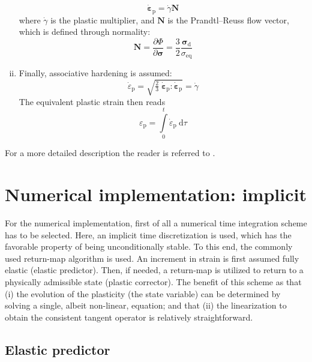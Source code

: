 \documentclass[times,namecite]{goose-article}
\begin{document}
\begin{enumerate}[(i)]
\begin{equation}
  \dot{\bm{\varepsilon}}_\mathrm{p}
  = \dot{\gamma} \bm{N}
\end{equation}
where $\dot{\gamma}$ is the plastic multiplier, and $\bm{N}$ is the Prandtl--Reuss flow vector, which is defined through normality:
\begin{equation}
  \bm{N}
  = \frac{\partial \Phi}{\partial \bm{\sigma}}
  = \frac{3}{2}
    \frac{\bm{\sigma}_\mathrm{d}}{\sigma_\mathrm{eq}}
\end{equation}
%
\item Finally, associative hardening is assumed:
\begin{equation}
  \dot{\varepsilon}_\mathrm{p}
  = \sqrt{\tfrac{2}{3} \; \dot{\bm{\varepsilon}}_\mathrm{p} : \dot{\bm{\varepsilon}}_\mathrm{p}}
  = \dot{\gamma}
\end{equation}
The equivalent plastic strain then reads
\begin{equation}
  \varepsilon_\mathrm{p} =
  \int\limits_0^t \dot{\varepsilon}_\mathrm{p} ~\mathrm{d}\tau
\end{equation}
%
\end{enumerate}
%
For a more detailed description the reader is referred to \citet[][p.\ 216-234]{DeSouzaNeto2008}.

\vfill\newpage
\section{Numerical implementation: implicit}

For the numerical implementation, first of all a numerical time integration scheme has to be selected. Here, an implicit time discretization is used, which has the favorable property of being unconditionally stable. To this end, the commonly used return-map algorithm is used. An increment in strain is first assumed fully elastic (elastic predictor). Then, if needed, a return-map is utilized to return to a physically admissible state (plastic corrector). The benefit of this scheme as that (i) the evolution of the plasticity (the state variable) can be determined by solving a single, albeit non-linear, equation; and that (ii) the linearization to obtain the consistent tangent operator is relatively straightforward.

\subsection{Elastic predictor}
\end{document}
